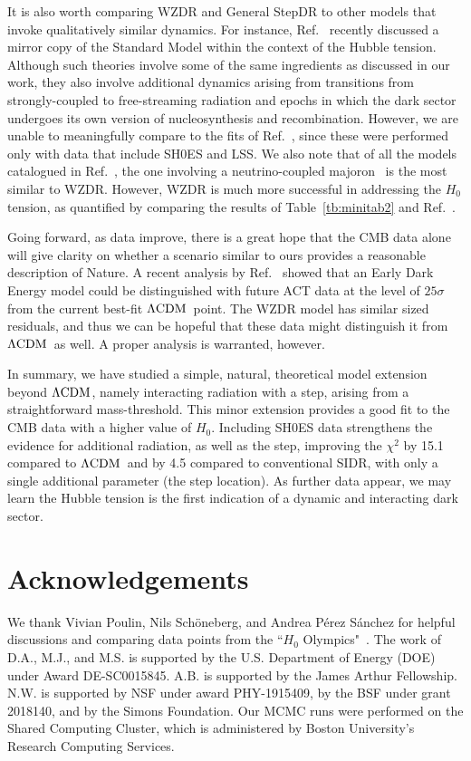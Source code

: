 \documentclass[aps,prd,twocolumn,nofootinbib,superscriptaddress]{revtex4}
\newcommand{\Tab}[1]{Table~\ref{tb:#1}}
\def\lcdm{$\Lambda{\rm CDM}$}
\begin{document}
It is also worth comparing WZDR and General StepDR to other models that invoke qualitatively similar dynamics. For instance, Ref.~\cite{Bansal:2021dfh} recently discussed a mirror copy of the Standard Model within the context of the Hubble tension. Although such theories involve some of the same ingredients as discussed in our work, they also involve additional dynamics arising from transitions from strongly-coupled to free-streaming radiation and epochs in which the dark sector undergoes its own version of nucleosynthesis and recombination. However, we are unable to meaningfully compare to the fits of Ref.~\cite{Bansal:2021dfh}, since these were performed only with data that include SH0ES and LSS. We also note that of all the models catalogued in Ref.~\cite{Schoneberg:2021qvd}, the one involving a neutrino-coupled majoron~\cite{Escudero:2019gvw,EscuderoAbenza:2020egd,Escudero:2021rfi} is the most similar to WZDR. However, WZDR is much more successful in addressing the $H_0$ tension, as quantified by comparing the results of \Tab{minitab2} and Ref.~\cite{Schoneberg:2021qvd}.

Going forward, as data improve, there is a great hope that the CMB data alone will give clarity on whether a scenario similar to ours provides a reasonable description of Nature. A recent analysis by Ref.~\cite{Hill:2021yec} showed that an Early Dark Energy model could be distinguished with future ACT data at the level of $25\sigma$ from the current best-fit \lcdm\ point. The WZDR model has similar sized residuals, and thus we can be hopeful that these data might distinguish it from \lcdm\ as well. A proper analysis is warranted, however.

In summary, we have studied a simple, natural, theoretical model extension beyond \lcdm, namely interacting radiation with a step, arising from a straightforward mass-threshold. This minor extension provides a good fit to the CMB data with a higher value of $H_0$. Including SH0ES data strengthens the evidence for additional radiation, as well as the step, improving the $\chi^2$ by 15.1 compared to \lcdm\ and by 4.5 compared to conventional SIDR, with only a single additional parameter (the step location). As further data appear, we may learn the Hubble tension is the first indication of a dynamic and interacting dark sector.





\section*{Acknowledgements}
We thank Vivian Poulin, Nils Sch\"{o}neberg, and Andrea P\'{e}rez S\'{a}nchez for helpful discussions and comparing data points from the ``$H_0$ Olympics"~\cite{Schoneberg:2021qvd}. The work of D.A., M.J., and M.S. is supported by the U.S. Department of Energy (DOE) under Award DE-SC0015845. A.B. is supported by the James Arthur Fellowship. N.W. is supported by NSF under award PHY-1915409, by the BSF under grant 2018140, and by the Simons Foundation. Our MCMC runs were performed on the Shared Computing Cluster, which is administered by Boston University's Research Computing Services.
\end{document}
